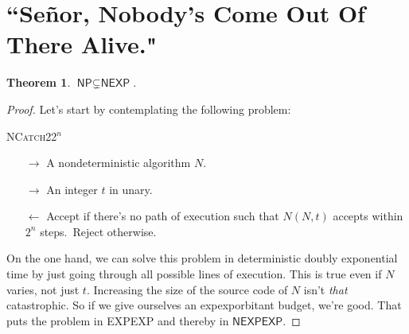 \documentclass{article}
\newtheorem{theorem}{Theorem}
\newcommand{\NP}{\ensuremath{\textsf{NP}}}
\newcommand{\NEXP}{\ensuremath{\textsf{NEXP}}}
\newcommand{\NEXPEXP}{\ensuremath{\textsf{NEXPEXP}}}
\begin{document}
\section{``Se\~{n}or, Nobody's Come Out Of There Alive."}

\begin{theorem}
$\NP \subsetneq \NEXP$.
\end{theorem}

\begin{proof}
Let's start by contemplating the following problem:
\begin{mdframed}
\textsc{NCatch22}$^n$
\begin{itemize}[noitemsep,topsep=0.3em]
\item[$\longrightarrow$] A nondeterministic algorithm $N$.
\item[$\longrightarrow$] An integer $t$ in unary.
\end{itemize}
\begin{itemize}[noitemsep,topsep=0.3em]
\item[$\longleftarrow$] Accept if there's no path of execution such that $N(N, t)$ accepts within $2^n$ steps.\footnotemark\ Reject otherwise.
\end{itemize}
\end{mdframed}
On the one hand, we can solve this problem in deterministic doubly exponential time by just going through all possible lines of execution. This is true even if $N$ varies, not just $t$. Increasing the size of the source code of $N$ isn't \textit{that} catastrophic. So if we give ourselves an expexporbitant budget, we're good. That puts the problem in \textsf{EXPEXP} and thereby in $\NEXPEXP$.


\end{proof}
\end{document}
